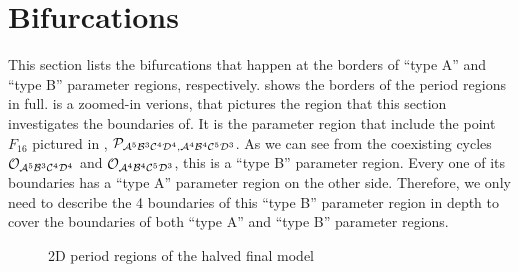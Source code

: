 \section{Bifurcations}
\label{sec:minrep.bif}

This section lists the bifurcations that happen at the borders of ``type A'' and ``type B'' parameter regions, respectively.
 shows the borders of the period regions in full.
 is a zoomed-in verions, that pictures the region that this section investigates the boundaries of.
It is the parameter region that include the point $F_{16}$ pictured in , $\mathcal{P}_{\mathcal{A}^5\mathcal{B}^3\mathcal{C}^4\mathcal{D}^4, \mathcal{A}^4\mathcal{B}^4\mathcal{C}^5\mathcal{D}^3}$.
As we can see from the coexisting cycles $\mathcal{O}_{\mathcal{A}^5\mathcal{B}^3\mathcal{C}^4\mathcal{D}^4}$ and $\mathcal{O}_{\mathcal{A}^4\mathcal{B}^4\mathcal{C}^5\mathcal{D}^3}$, this is a ``type B'' parameter region.
Every one of its boundaries has a ``type A'' parameter region on the other side.
Therefore, we only need to describe the 4 boundaries of this ``type B'' parameter region in depth to cover the boundaries of both ``type A'' and ``type B'' parameter regions.

\begin{figure}
    \centering
    \caption{2D period regions of the halved final model}
\end{figure}

